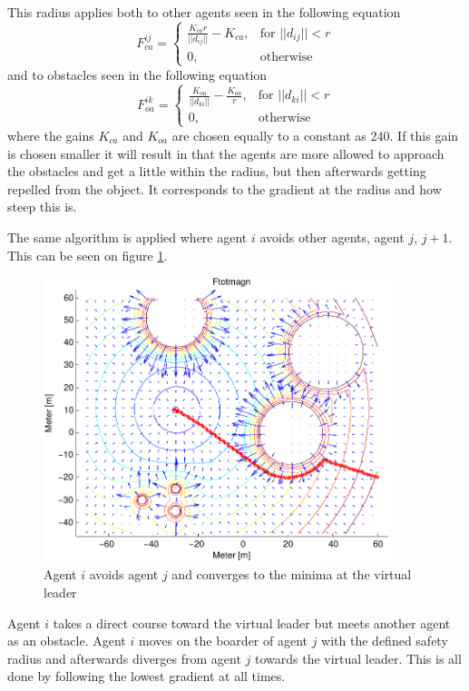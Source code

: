 This radius applies both to other agents seen in the following equation
\[
    F_{ca}^{ij}= 
\begin{cases}
    \frac{K_{ca}r}{||d_{ij}||}-K_{ca},& \text{for } ||d_{ij}||<r\\
    0,              & \text{otherwise}
\end{cases}
\]
and to obstacles seen in the following equation
\[
    F_{oa}^{ik}= 
\begin{cases}
    \frac{K_{oa}}{||d_{ki}||}-\frac{K_{oa}}{r},& \text{for } ||d_{ki}||<r\\
    0,              & \text{otherwise}
\end{cases}
\]
where the gains $K_{ca}$ and $K_{oa}$ are chosen equally to a constant as 240. If this gain is chosen smaller it will result in that the agents are more allowed to approach the obstacles and get a little within the radius, but then afterwards getting repelled from the object. It corresponds to the gradient at the radius and how steep this is.

The same algorithm is applied where agent $i$ avoids other agents, agent $j$, $j+1$. This can be seen on figure \ref{fig:avoidagent}.
\begin{figure}[htbp]
  \includegraphics[width=0.9\textwidth]{fig/ftotmagnfigpdf}
  \caption{Agent $i$ avoids agent $j$ and converges to the minima at the virtual leader}
  \label{fig:avoidagent}
\end{figure}
Agent $i$ takes a direct course toward the virtual leader but meets another agent as an obstacle. Agent $i$ moves on the boarder of agent $j$ with the defined safety radius and afterwards diverges from agent $j$ towards the virtual leader. This is all done by following the lowest gradient at all times.

